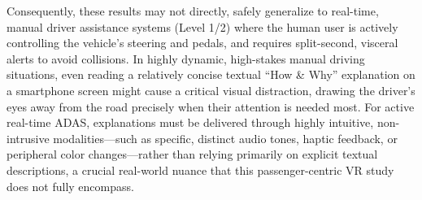 Consequently, these results may not directly, safely generalize to real-time, manual driver assistance systems (Level 1/2) where the human user is actively controlling the vehicle's steering and pedals, and requires split-second, visceral alerts to avoid collisions. In highly dynamic, high-stakes manual driving situations, even reading a relatively concise textual ``How \& Why'' explanation on a smartphone screen might cause a critical visual distraction, drawing the driver's eyes away from the road precisely when their attention is needed most. For active real-time ADAS, explanations must be delivered through highly intuitive, non-intrusive modalities---such as specific, distinct audio tones, haptic feedback, or peripheral color changes---rather than relying primarily on explicit textual descriptions, a crucial real-world nuance that this passenger-centric VR study does not fully encompass.
